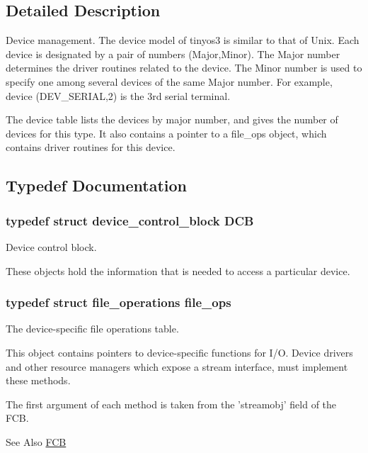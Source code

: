 \subsection{Detailed Description}
Device management. The device model of tinyos3 is similar to that of Unix. Each device is designated by a pair of numbers (Major,Minor). The Major number determines the driver routines related to the device. The Minor number is used to specify one among several devices of the same Major number. For example, device (D\-E\-V\-\_\-\-S\-E\-R\-I\-A\-L,2) is the 3rd serial terminal.

The device table lists the devices by major number, and gives the number of devices for this type. It also contains a pointer to a file\-\_\-ops object, which contains driver routines for this device. 

\subsection{Typedef Documentation}
\hypertarget{group__dev_gaf0e2d4a982667466d84f6fb7522611d6}{
\subsubsection[{D\-C\-B}]{\setlength{\rightskip}{0pt plus 5cm}typedef struct {\bf device\-\_\-control\-\_\-block}  {\bf D\-C\-B}}}\label{group__dev_gaf0e2d4a982667466d84f6fb7522611d6}


Device control block. 

These objects hold the information that is needed to access a particular device. \hypertarget{group__dev_gaab625d8ae3a95e942ed10ed1579f5042}{
\subsubsection[{file\-\_\-ops}]{\setlength{\rightskip}{0pt plus 5cm}typedef struct {\bf file\-\_\-operations}  {\bf file\-\_\-ops}}}\label{group__dev_gaab625d8ae3a95e942ed10ed1579f5042}


The device-\/specific file operations table. 

This object contains pointers to device-\/specific functions for I/\-O. Device drivers and other resource managers which expose a stream interface, must implement these methods.

The first argument of each method is taken from the 'streamobj' field of the F\-C\-B. \begin{DoxySeeAlso}{See Also}
\hyperlink{group__rlists_ga60c6c294fa1d8ea73ed270404fe5c17d}{F\-C\-B} 
\end{DoxySeeAlso}


